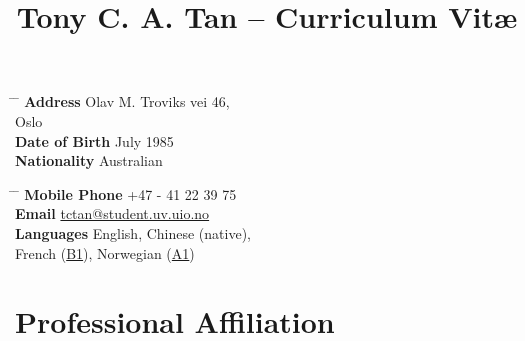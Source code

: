 \documentclass[10pt]{article} %
\begin{document}

\title{Tony C. A. Tan -- Curriculum Vit\ae} %


\parbox{0.5\textwidth}{ %
\begin{tabbing} %
\hspace{3cm} \= \hspace{4cm} \= \kill %
{\bf Address} \> Olav M. Troviks vei 46,\\ %
 Oslo \\ %
{\bf Date of Birth}  July 1985\\ %
{\bf Nationality} \> Australian %
\end{tabbing}}
\hfill %
\parbox{0.5\textwidth}{ %
\begin{tabbing} %
\hspace{3cm} \= \hspace{4cm} \= \kill %
{\bf Mobile Phone} \> +47 - 41 22 39 75 \\ %
{\bf Email} \> \href{mailto:tctan@student.uv.uio.no}{tctan@student.uv.uio.no}\\ %
{\bf Languages} \> English, Chinese (native),\\
\> French (\href{https://rm.coe.int/168045bb57}{B1}), Norwegian (\href{https://rm.coe.int/168045bb61}{A1}) \\ %
\end{tabbing}}


\section{Professional Affiliation}

\end{document}
